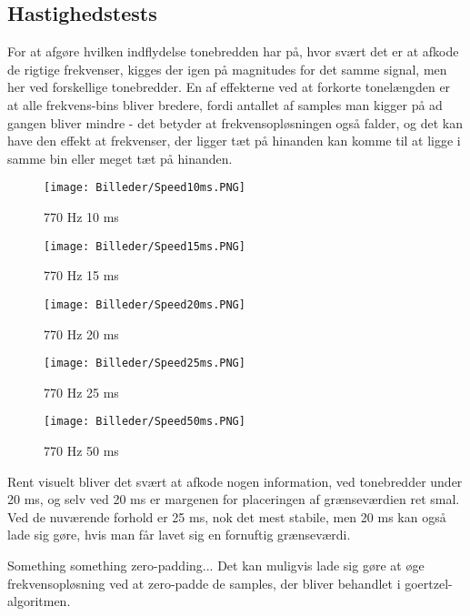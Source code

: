 \subsection{Hastighedstests} \label{sec:hastighedstest}

For at afgøre hvilken indflydelse tonebredden har på, hvor svært det er at afkode de rigtige frekvenser, kigges der igen på magnitudes for det samme signal, men her ved forskellige tonebredder. En af effekterne ved at forkorte tonelængden er at alle frekvens-bins bliver bredere, fordi antallet af samples man kigger på ad gangen bliver mindre - det betyder at frekvensopløsningen også falder, og det kan have den effekt at frekvenser, der ligger tæt på hinanden kan komme til at ligge i samme bin eller meget tæt på hinanden. 

\begin{figure}[h!]
\centering
\texttt{[image: Billeder/Speed10ms.PNG]}
\caption{770 Hz 10 ms}
\label{fig:10ms}
\end{figure} 

\begin{figure}[h!]
\centering
\texttt{[image: Billeder/Speed15ms.PNG]}
\caption{770 Hz 15 ms}
\label{fig:15ms}
\end{figure} 

\begin{figure}[h!]
\centering
\texttt{[image: Billeder/Speed20ms.PNG]}
\caption{770 Hz 20 ms}
\label{fig:20ms}
\end{figure} 

\begin{figure}[h!]
\centering
\texttt{[image: Billeder/Speed25ms.PNG]}
\caption{770 Hz 25 ms}
\label{fig:25ms}
\end{figure} 

\begin{figure}[h!]
\centering
\texttt{[image: Billeder/Speed50ms.PNG]}
\caption{770 Hz 50 ms}
\label{fig:50ms}
\end{figure} 

Rent visuelt bliver det svært at afkode nogen information, ved tonebredder under 20 ms, og selv ved 20 ms er margenen for placeringen af grænseværdien ret smal. Ved de nuværende forhold er 25 ms, nok det mest stabile, men 20 ms kan også lade sig gøre, hvis man får lavet sig en fornuftig grænseværdi.

Something something zero-padding... Det kan muligvis lade sig gøre at øge frekvensopløsning ved at zero-padde de samples, der bliver behandlet i goertzel-algoritmen.

